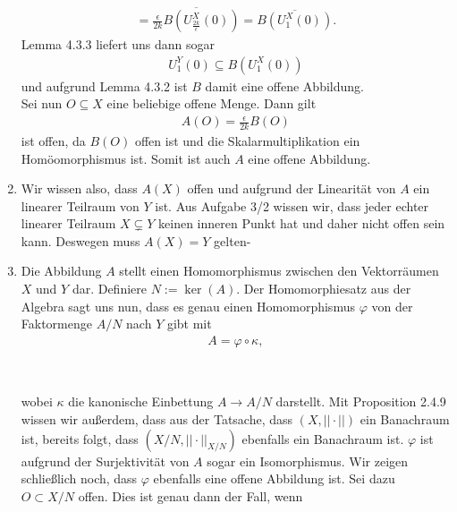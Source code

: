 \begin{solution}
\begin{enumerate}[label = (\roman*)]
\begin{align*}
    = \overline{\frac{\epsilon}{2k}B(U_{\frac{2k}{\epsilon}}^X(0))}
    = \overline{B(U_{1}^X(0))}.
  \end{align*}
  Lemma 4.3.3 liefert uns dann sogar
  \begin{align*}
    U_1^Y(0) \subseteq B(U_{1}^X(0))
  \end{align*}
  und aufgrund Lemma 4.3.2 ist $B$ damit eine offene Abbildung. \\
  Sei nun $O \subseteq X$ eine beliebige offene Menge. Dann gilt
  \begin{align*}
    A(O) = \frac{\epsilon}{2k}B(O)
  \end{align*}
  ist offen, da $B(O)$ offen ist und die Skalarmultiplikation ein Homöomorphismus ist.
  Somit ist auch $A$ eine offene Abbildung.
  \item Wir wissen also, dass $A(X)$ offen und aufgrund der Linearität von $A$
  ein linearer Teilraum von $Y$ ist. Aus Aufgabe 3/2 wissen wir, dass
  jeder echter linearer Teilraum $X \subsetneq Y$ keinen inneren Punkt hat und
  daher nicht offen sein kann. Deswegen muss $A(X) = Y$ gelten-
  \item Die Abbildung $A$ stellt einen Homomorphismus zwischen den Vektorräumen
  $X$ und $Y$ dar. Definiere $N := \ker(A)$. Der Homomorphiesatz aus der Algebra
  sagt uns nun, dass es genau einen Homomorphismus $\varphi$ von der Faktormenge $A/N$
  nach $Y$ gibt mit
  \begin{align*}
    A = \varphi \circ \kappa,
  \end{align*}
  \begin{center}
   \\
  \end{center}
  wobei $\kappa$ die kanonische Einbettung $A \rightarrow A/N$ darstellt.
  Mit Proposition 2.4.9 wissen wir außerdem, dass aus der Tatsache, dass $(X,||\cdot||)$
  ein Banachraum ist, bereits folgt, dass $(X/N, ||\cdot||_{X/N})$ ebenfalls ein
  Banachraum ist. $\varphi$ ist aufgrund der Surjektivität von $A$ sogar ein
  Isomorphismus. Wir zeigen schließlich noch, dass $\varphi$ ebenfalls eine offene Abbildung ist.
  Sei dazu $O \subset X/N$ offen. Dies ist genau dann der Fall, wenn
  \begin{align*}

\end{align*}
\end{enumerate}
\end{solution}
